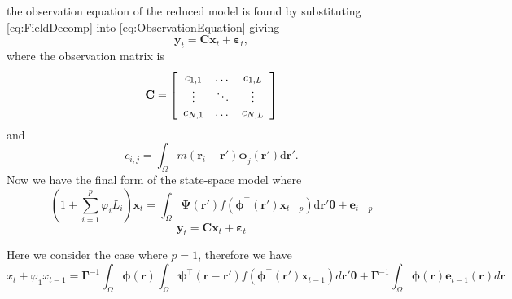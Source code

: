 \documentclass[a4paper,10pt]{article}
\begin{document}
the observation equation of the reduced model is found by substituting \eqref{eq:FieldDecomp} into \eqref{eq:ObservationEquation} giving
\begin{equation}\label{ObservationEquation} 
	\mathbf{y}_t = \mathbf{C}\mathbf{x}_t + \boldsymbol{\varepsilon}_t,
\end{equation}
where the observation matrix is 
\begin{equation}
	\mathbf{C} = \left[
	\begin{array}{{ccc}} 
		c_{1,1} & \dots & c_{1,L} \\
		\vdots & \ddots & \vdots \\
		c_{N,1} & \dots & c_{N,L} 
	\end{array}
	\right] 
\end{equation}
and 
\begin{equation}
	c_{i,j} = \int_{\Omega}m(\mathbf{r}_i - \mathbf{r}')\boldsymbol{\phi}_j(\mathbf{r}')\textrm{d}\mathbf{r}'. 
\end{equation}
Now we have the final form of the state-space model where
\begin{equation}\label{eq:finalformstatespacemodel}
	(1+\sum_{i=1}^{p}\varphi_i L_i) \mathbf{x}_t = \int_\Omega \boldsymbol{\Psi}(\mathbf{r}') f(\boldsymbol{\phi}^{\top}(\mathbf{r}')\mathbf{x}_{t-p}) \textrm{d}\mathbf{r}' \boldsymbol{\theta}
 +\mathbf{e}_{t-p}
\end{equation}
\begin{equation} 
	\mathbf{y}_t = \mathbf{C}\mathbf{x}_t + \boldsymbol{\varepsilon}_t
\end{equation}


Here we consider the case where $p=1$, therefore we have
\begin{equation}
x_t+\varphi_{1} x_{t-1}=\boldsymbol\Gamma^{-1}\int_{\Omega}\boldsymbol \phi(\mathbf r)\int_{\Omega}\boldsymbol{\psi}^\top\left(\mathbf{r}-\mathbf{r}'\right) f(\boldsymbol{\phi}^{\top}\left(\mathbf{r'}\right) \mathbf{x}_{t-1})d\mathbf r'\boldsymbol{\theta}+\boldsymbol\Gamma^{-1}\int_{\Omega}\boldsymbol\phi(\mathbf r)\mathbf e_{t-1}(\mathbf r)d\mathbf r
\end{equation}
\end{document}
